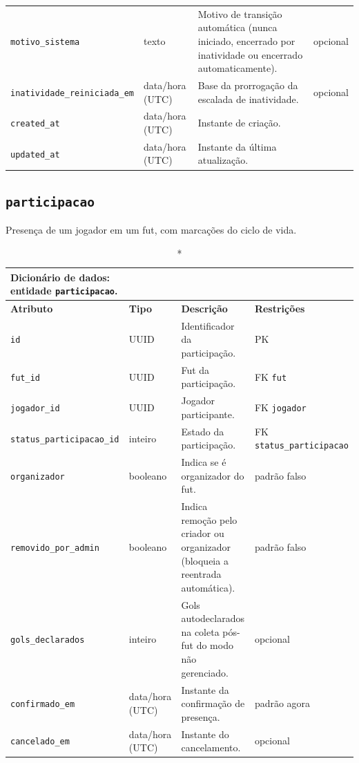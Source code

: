 \begin{apendicesenv}
\begin{longtable}{p{2.5cm}p{2.1cm}p{5.8cm}p{2.9cm}}
        \texttt{motivo\_sistema} & texto & Motivo de transição automática (nunca iniciado, encerrado por inatividade ou encerrado automaticamente). & opcional \\
        \texttt{inatividade\_reiniciada\_em} & data/hora (UTC) & Base da prorrogação da escalada de inatividade. & opcional \\
        \texttt{created\_at} & data/hora (UTC) & Instante de criação. & \\
        \texttt{updated\_at} & data/hora (UTC) & Instante da última atualização. & \\
        \hline
    \end{longtable}

    \subsection*{\texttt{participacao}}
    Presença de um jogador em um fut, com marcações do ciclo de vida.
    \begin{longtable}{p{2.5cm}p{2.1cm}p{5.8cm}p{2.9cm}}
    \caption*{Dicionário de dados: entidade \texttt{participacao}.}\\
        \hline
        \textbf{Atributo} & \textbf{Tipo} & \textbf{Descrição} & \textbf{Restrições} \\
        \hline
        \endhead
        \texttt{id} & UUID & Identificador da participação. & PK \\
        \texttt{fut\_id} & UUID & Fut da participação. & FK \texttt{fut} \\
        \texttt{jogador\_id} & UUID & Jogador participante. & FK \texttt{jogador} \\
        \texttt{status\_participacao\_id} & inteiro & Estado da participação. & FK \texttt{status\_participacao} \\
        \texttt{organizador} & booleano & Indica se é organizador do fut. & padrão falso \\
        \texttt{removido\_por\_admin} & booleano & Indica remoção pelo criador ou organizador (bloqueia a reentrada automática). & padrão falso \\
        \texttt{gols\_declarados} & inteiro & Gols autodeclarados na coleta pós-fut do modo não gerenciado. & opcional \\
        \texttt{confirmado\_em} & data/hora (UTC) & Instante da confirmação de presença. & padrão agora \\
        \texttt{cancelado\_em} & data/hora (UTC) & Instante do cancelamento. & opcional \\

\end{longtable}
\end{apendicesenv}
